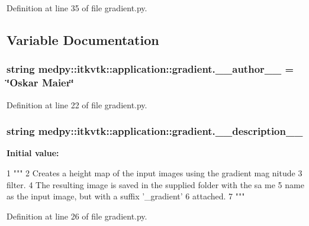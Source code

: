 Definition at line 35 of file gradient.py.



\subsection{Variable Documentation}
\hypertarget{namespacemedpy_1_1itkvtk_1_1application_1_1gradient_ae7317d6c2fac33f4046e6b1a325dab31}{
\subsubsection[{\_\-\_\-author\_\-\_\-}]{\setlength{\rightskip}{0pt plus 5cm}string {\bf medpy::itkvtk::application::gradient.\_\-\_\-author\_\-\_\-} = \char`\"{}Oskar Maier\char`\"{}}}
\label{namespacemedpy_1_1itkvtk_1_1application_1_1gradient_ae7317d6c2fac33f4046e6b1a325dab31}


Definition at line 22 of file gradient.py.

\hypertarget{namespacemedpy_1_1itkvtk_1_1application_1_1gradient_a4e1790a68d670d6345dc23be43b5189c}{
\subsubsection[{\_\-\_\-description\_\-\_\-}]{\setlength{\rightskip}{0pt plus 5cm}string {\bf medpy::itkvtk::application::gradient.\_\-\_\-description\_\-\_\-}}}
\label{namespacemedpy_1_1itkvtk_1_1application_1_1gradient_a4e1790a68d670d6345dc23be43b5189c}
{\bfseries Initial value:}
\begin{DoxyCode}
1 """
2                   Creates a height map of the input images using the gradient mag
      nitude
3                   filter.
4                   The resulting image is saved in the supplied folder with the sa
      me
5                   name as the input image, but with a suffix '_gradient'
6                   attached.
7                   """
\end{DoxyCode}


Definition at line 26 of file gradient.py.

